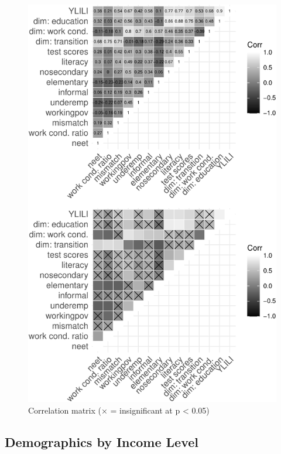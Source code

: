 \documentclass[
  a4paper, twoside, 12pt]{book}
\begin{document}
\begin{figure}[H]

{\centering \includegraphics{figures/fig-cormat-1} 

}

\caption[Correlation matrix]{Correlation matrix (× = insignificant at p < 0.05)}\label{fig:fig-cormat}
\end{figure}

\newpage

\hypertarget{demographics}{%
\subsection*{Demographics by Income Level}\label{demographics}}
\end{document}
